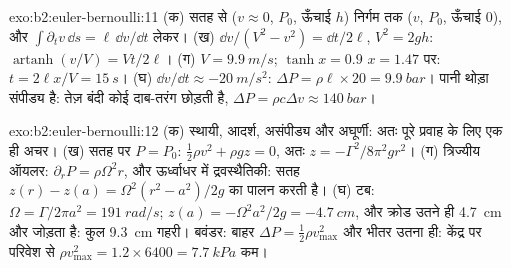 \begin{solution}{exo:b2:euler-bernoulli:11}
(क) सतह से ($v \approx 0$, $P_0$, ऊँचाई $h$) निर्गम तक ($v$, $P_0$,
ऊँचाई $0$), और $\int\partial_tv\,\dd s = \ell\,\dd v/\dd t$ लेकर। (ख) $\dd v/(V^2 -
v^2) = \dd t/2\ell$, $V^2 = 2gh$: $\operatorname{artanh}(v/V) = Vt/2\ell$। (ग) $V =
\qty{9.9}{m/s}$; $\tanh x = 0.9$ $x = 1.47$ पर: $t = 2\ell x/V = \qty{15}{s}$। (घ)
$\dd v/\dd t \approx \qty{-20}{m/s^2}$: $\Delta P = \rho\ell \times 20 = \qty{9.9}{bar}$।
पानी थोड़ा संपीड्य है: तेज़ बंदी कोई दाब-तरंग छोड़ती है,
$\Delta P = \rho c\Delta v \approx \qty{140}{bar}$।
\end{solution}

\begin{solution}{exo:b2:euler-bernoulli:12}
(क) स्थायी, आदर्श, असंपीड्य और अघूर्णी: अतः पूरे प्रवाह के लिए एक ही
अचर। (ख) सतह पर $P = P_0$: $\tfrac12\rho v^2 + \rho gz =
0$, अतः $z = -\Gamma^2/8\pi^2gr^2$। (ग) त्रिज्यीय ऑयलर: $\partial_rP = \rho\Omega^2r$,
और ऊर्ध्वाधर में द्रवस्थैतिकी: सतह $z(r) - z(a) = \Omega^2(r^2 -
a^2)/2g$ का पालन करती है। (घ) टब: $\Omega = \Gamma/2\pi a^2 = \qty{191}{rad/s}$; $z(a) = -\Omega^2a^2/
2g = \qty{-4.7}{cm}$, और क्रोड उतने ही \qty{4.7}{cm} और जोड़ता है: कुल \qty{9.3}{cm} गहरी।
बवंडर: बाहर $\Delta P = \tfrac12\rho v_{\max}^2$ और भीतर उतना ही:
केंद्र पर परिवेश से $\rho v_{\max}^2 = 1.2 \times 6400 = \qty{7.7}{kPa}$ कम।
\end{solution}

